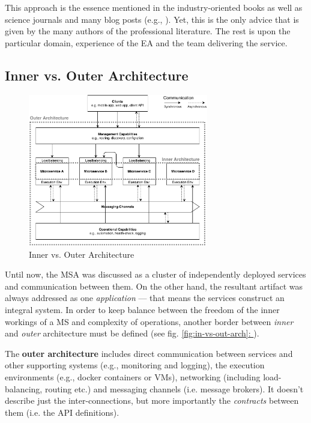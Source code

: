 \documentclass[thesis=M,english,hidelinks]{FITthesis}[2012/10/20]
\newcommand*{\fullref}[1]{\hyperref[{#1}]{\autoref*{#1}: \nameref*{#1}}}
\begin{document}
This approach is the essence mentioned in the industry-oriented books \cite{ms-building-ms, ms-evolutionary-arch, ms-patterns, ms-ca} as well as science journals \cite{ms-integrating-with-adaptable-ea, ms-towards-integrated-soa, ms-design-tradeoffs, ms-approaches-to-soa-evolution, ms-self-managing} and many blog posts (e.g., \cite{ms-fow-new-term-def, ms-modelling-with-petter}). Yet, this is the only advice that is given by the many authors of the professional literature. The rest is upon the particular domain, experience of the \acrlong{EA} and the team delivering the service. 

\subsection{Inner vs. Outer Architecture}

\begin{figure}
  \centering
    \includegraphics[width=0.7\textwidth]{images/architecture_inner_vs_outer.pdf}
    \caption{Inner vs. Outer Architecture}
  \label{fig:in-vs-out-arch}
\end{figure}

Until now, the \acrshort{MSA} was discussed as a cluster of independently deployed services and communication between them. On the other hand, the resultant artifact was always addressed as one \textit{application} --- that means the services construct an integral system. In order to keep balance between the freedom of the inner workings of a \acrshort{MS} and complexity of operations, another border between \textit{inner} and \textit{outer} architecture must be defined (see fig. \fullref{fig:in-vs-out-arch}).

The \textbf{outer architecture} includes direct communication between services and other supporting systems (e.g., monitoring and logging), the execution environments (e.g., docker containers or \acrshort{VM}s), networking (including load-balancing, routing etc.) and messaging channels (i.e. message brokers). It doesn't describe just the inter-connections, but more importantly the \textit{contracts} between them (i.e. the \acrshort{API} definitions). 
\end{document}
